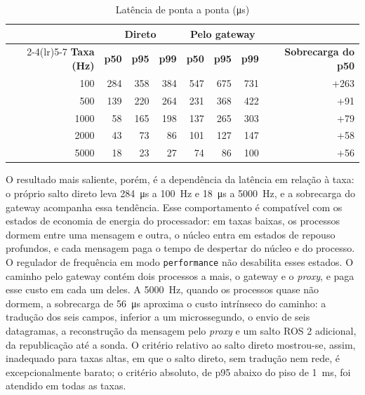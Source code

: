 \documentclass[
    12pt,
    oneside,
    a4paper,
    chapter=TITLE,
    section=TITLE,
    english,
    brazil
]{abntex2}
\begin{document}
\begin{table}[H]
\centering
\fontsize{10}{12}\selectfont
\caption{Latência de ponta a ponta (\si{\micro\second})}
\label{tab:h4}
\begin{tabular}{@{}rrrrrrrr@{}}
\toprule
& \multicolumn{3}{c}{\textbf{Direto}} & \multicolumn{3}{c}{\textbf{Pelo gateway}} & \\
\cmidrule(lr){2-4}\cmidrule(lr){5-7}
\textbf{Taxa (\si{\hertz})} & \textbf{p50} & \textbf{p95} & \textbf{p99} &
 \textbf{p50} & \textbf{p95} & \textbf{p99} & \textbf{Sobrecarga do p50} \\
\midrule
100 & 284 & 358 & 384 & 547 & 675 & 731 & +263 \\
500 & 139 & 220 & 264 & 231 & 368 & 422 & +91 \\
\num{1000} & 58 & 165 & 198 & 137 & 265 & 303 & +79 \\
\num{2000} & 43 & 73 & 86 & 101 & 127 & 147 & +58 \\
\num{5000} & 18 & 23 & 27 & 74 & 86 & 100 & +56 \\
\bottomrule
\end{tabular}
\end{table}

O resultado mais saliente, porém, é a dependência da latência em relação
à taxa: o próprio salto direto leva \SI{284}{\micro\second} a
\SI{100}{\hertz} e \SI{18}{\micro\second} a \SI{5000}{\hertz}, e a
sobrecarga do gateway acompanha essa tendência. Esse comportamento é
compatível com os estados de economia de energia do processador: em taxas
baixas, os processos dormem entre uma mensagem e outra, o núcleo entra em
estados de repouso profundos, e cada mensagem paga o tempo de despertar do
núcleo e do processo. O regulador de frequência em modo
\texttt{performance} não desabilita esses estados. O caminho pelo gateway
contém dois processos a mais, o gateway e o \textit{proxy}, e paga esse
custo em cada um deles. A \SI{5000}{\hertz}, quando os processos quase não
dormem, a sobrecarga de \SI{56}{\micro\second} aproxima o custo intrínseco
do caminho: a tradução dos seis campos, inferior a um microssegundo, o
envio de seis datagramas, a reconstrução da mensagem pelo \textit{proxy} e
um salto ROS 2 adicional, da republicação até a sonda. O critério relativo
ao salto direto mostrou-se, assim, inadequado para taxas altas, em que o
salto direto, sem tradução nem rede, é excepcionalmente barato; o critério
absoluto, de p95 abaixo do piso de \SI{1}{\milli\second}, foi atendido em
todas as taxas.
\end{document}
